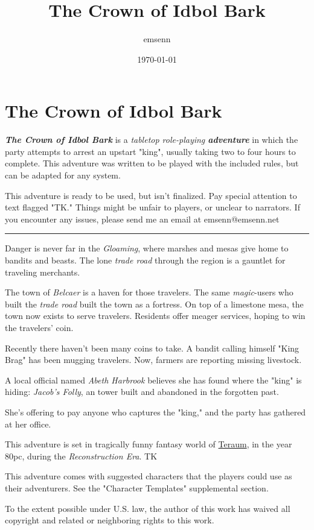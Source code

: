 \documentclass[11pt]{teraum_adventure}
\author{emsenn}
\date{\today}
\title{The Crown of Idbol Bark}
\begin{document}
\section*{The Crown of Idbol Bark}
\label{sec:org01ad761}
\textbf{\emph{The Crown of Idbol Bark}} is a \emph{tabletop role-playing \textbf{adventure}} in which the party attempts to arrest an upstart "king", usually taking two to four hours to complete.
This adventure was written to be played with the included rules, but can be adapted for any system.

This adventure is ready to be used, but isn't finalized. Pay special attention to text flagged "TK." Things might be unfair to players, or unclear to narrators. If you encounter any issues, please send me an email at emsenn@emsenn.net

\noindent\rule{.3\textwidth}{0.8pt}

Danger is never far in the \emph{Gloaming}, where marshes and mesas give
home to bandits and beasts. The lone \emph{trade road} through the region
is a gauntlet for traveling merchants.

The town of \emph{Belcaer} is a haven for those travelers. The same
\emph{magic}-users who built the \emph{trade road} built the town as a fortress.
On top of a limestone mesa, the town now exists to serve travelers.
Residents offer meager services, hoping to win the travelers' coin.

Recently there haven't been many coins to take. A bandit calling
himself "King Brag" has been mugging travelers. Now, farmers are
reporting missing livestock.

A local official named \emph{Abeth Harbrook} believes she has found where
the "king" is hiding: \emph{Jacob's Folly}, an tower built and abandoned in
the forgotten past.

She's offering to pay anyone who captures the "king," and the party
has gathered at her office.

\textbf{\emph{}}

This adventure is set in tragically funny fantasy world of \href{../index.org}{Teraum}, in the year 80pc, during the \emph{Reconstruction Era}.
TK

This adventure comes with suggested characters that the players could use as their adventurers. See the "Character Templates" supplemental section.

To the extent possible under U.S. law, the author of this work has
waived all copyright and related or neighboring rights to this work.
\end{document}
